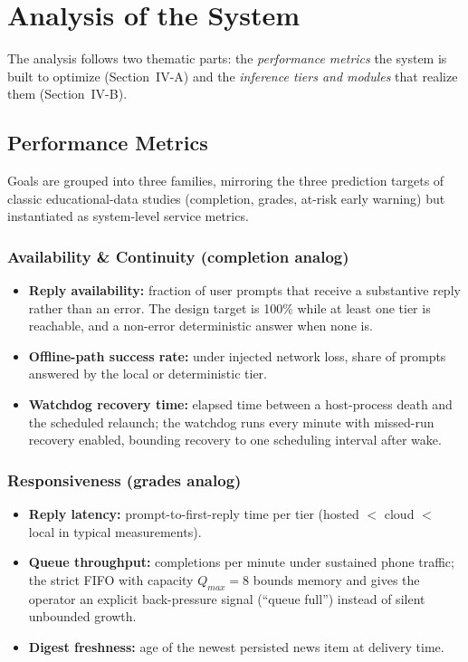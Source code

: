 \section{Analysis of the System}

The analysis follows two thematic parts: the \emph{performance
metrics} the system is built to optimize
(Section~IV-A) and the \emph{inference tiers and modules} that
realize them (Section~IV-B).

\subsection{Performance Metrics}

Goals are grouped into three families, mirroring the three
prediction targets of classic educational-data studies
(completion, grades, at-risk early warning) but instantiated as
system-level service metrics.

\subsubsection{Availability \& Continuity (completion analog)}
\begin{itemize}
  \item \textbf{Reply availability:} fraction of user prompts
  that receive a substantive reply rather than an error. The
  design target is 100\% while at least one tier is reachable,
  and a non-error deterministic answer when none is.
  \item \textbf{Offline-path success rate:} under injected
  network loss, share of prompts answered by the local or
  deterministic tier.
  \item \textbf{Watchdog recovery time:} elapsed time between a
  host-process death and the scheduled relaunch; the watchdog
  runs every minute with missed-run recovery enabled, bounding
  recovery to one scheduling interval after wake.
\end{itemize}

\subsubsection{Responsiveness (grades analog)}
\begin{itemize}
  \item \textbf{Reply latency:} prompt-to-first-reply time per
  tier (hosted $<$ cloud $<$ local in typical measurements).
  \item \textbf{Queue throughput:} completions per minute under
  sustained phone traffic; the strict FIFO with capacity
  $Q_{max}=8$ bounds memory and gives the operator an explicit
  back-pressure signal (``queue full'') instead of silent
  unbounded growth.
  \item \textbf{Digest freshness:} age of the newest persisted
  news item at delivery time.
\end{itemize}

